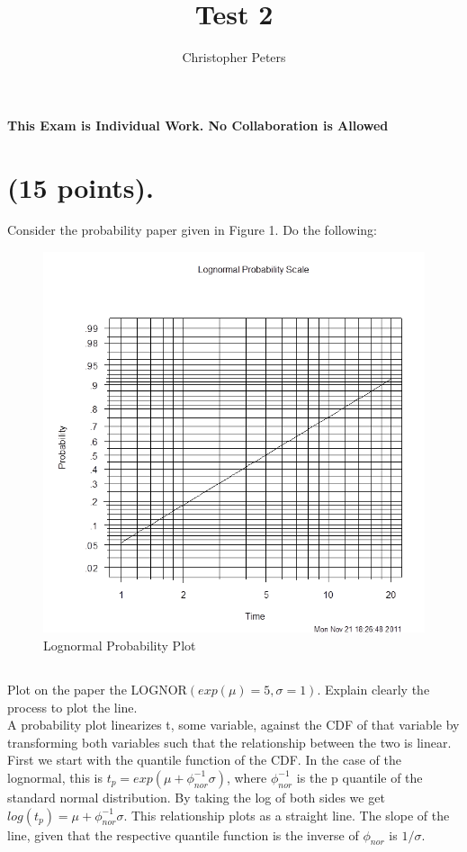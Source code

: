 \documentclass{article}
\begin{document}
\title{Test 2}
\author{Christopher Peters}
\maketitle

{\bf This Exam is Individual Work. No Collaboration is Allowed}\\
\section{(15 points).}
Consider the probability paper given in Figure 1. Do the following:\\

\begin{figure}[h]
  \centering
  \includegraphics[width = 5in]{lognormal_graph_1.png}
  \caption{Lognormal Probability Plot}
\end{figure}

\subsection{} 
Plot on the paper the LOGNOR\begin{math}(exp(\mu) = 5, \sigma = 1).\end{math}
Explain clearly the process to plot the line.\\

A probability plot linearizes t, some variable, against the CDF of that variable by transforming both variables such that the relationship between the two is linear.  First we start with the quantile function of the CDF.  In the case of the lognormal, this is \(t_p = exp(\mu + \phi_{nor}^{-1} \sigma)\), where \(\phi_{nor}^{-1}\) is the p quantile of the standard normal distribution.  By taking the log of both sides we get \(log(t_p) = \mu + \phi_{nor}^{-1} \sigma\).  This relationship plots as a straight line.  The slope of the line, given that the respective quantile function is the inverse of  \(\phi_{nor}\) is \(1/\sigma\).\\
\end{document}
